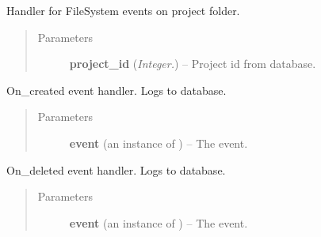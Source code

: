 \documentclass[letterpaper,10pt,english]{sphinxmanual}
\begin{document}

\begin{fulllineitems}
\label{controller:controller.PROJECT_FILE_EVENT_HANDLER}
Handler for FileSystem events on project folder.
\begin{quote}\begin{description}
\item[{Parameters}] \leavevmode
\textbf{project\_id} (\emph{Integer.}) -- Project id from database.

\end{description}\end{quote}

\begin{fulllineitems}
\label{controller:controller.PROJECT_FILE_EVENT_HANDLER.on_created}
On\_created event handler. Logs to database.
\begin{quote}\begin{description}
\item[{Parameters}] \leavevmode
\textbf{event} (an instance of ) -- The event.

\end{description}\end{quote}

\end{fulllineitems}


\begin{fulllineitems}
\label{controller:controller.PROJECT_FILE_EVENT_HANDLER.on_deleted}
On\_deleted event handler. Logs to database.
\begin{quote}\begin{description}
\item[{Parameters}] \leavevmode
\textbf{event} (an instance of ) -- The event.

\end{description}\end{quote}

\end{fulllineitems}


\end{fulllineitems}
\end{document}
